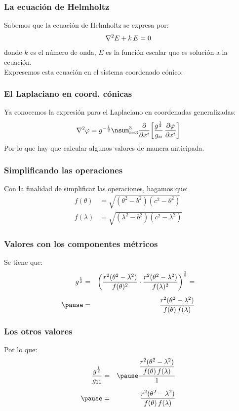 \documentclass[12pt]{beamer}
\begin{document}
\begin{frame}
\frametitle{La ecuación de Helmholtz}
Sabemos que la ecuación de Helmholtz se expresa por:
\pause
\begin{align*}
\laplacian{E} + k \, E = 0
\end{align*}
donde $k$ es el número de onda, $E$ es la función escalar que es solución a la ecuación.
\\
\bigskip
\pause
Expresemos esta ecuación en el sistema coordenado cónico.
\end{frame}
\begin{frame}
\frametitle{El Laplaciano en coord. cónicas}
Ya conocemos la expresión para el Laplaciano en coordenadas generalizadas:
\begin{align*}
\laplacian{\varphi} = g^{-\frac{1}{2}} \nsum_{i=3}^{3} \pdv{x^{i}} \bigg[ \dfrac{g^{\frac{1}{2}}}{g_{ii}} \, \pdv{\varphi}{x^{i}}\bigg]
  \end{align*}
\pause
Por lo que hay que calcular algunos valores de manera anticipada.  
\end{frame}
\begin{frame}
\frametitle{Simplificando las operaciones}
Con la finalidad de simplificar las operaciones, hagamos que:
\pause
\begin{align*}
f(\theta) &= \sqrt{(\theta^{2} - b^{2})(c^{2} - \theta^{2})} \\[0.5em]
f(\lambda) &= \sqrt{(\lambda^{2} - b^{2})(c^{2} - \lambda^{2})}
\end{align*}
\end{frame}
\begin{frame}
\frametitle{Valores con los componentes métricos}
Se tiene que:
\pause
\begin{eqnarray*}
g^{\frac{1}{2}} &=& \left( \dfrac{r^{2} (\theta^{2} - \lambda^{2})}{f(\theta)^{2}} \cdot \dfrac{r^{2} (\theta^{2} - \lambda^{2})}{f(\lambda)^{2}} \right)^{\frac{1}{2}} = \\[0.5em] \pause
&=& \dfrac{r^{2} (\theta^{2} - \lambda^{2})}{f(\theta) \, f(\lambda)}
\end{eqnarray*}
\end{frame}
\begin{frame}
\frametitle{Los otros valores}
Por lo que:
\begin{eqnarray*}
\dfrac{g^{\frac{1}{2}}}{g_{11}} &=& \pause \dfrac{\dfrac{r^{2}(\theta^{2} - \lambda^{2})}{f(\theta) \, f(\lambda)}}{1} \\[0.5em] \pause
&=& \dfrac{r^{2}(\theta^{2} - \lambda^{2})}{f(\theta) \, f(\lambda)}
\end{eqnarray*}
\end{frame}
\end{document}

